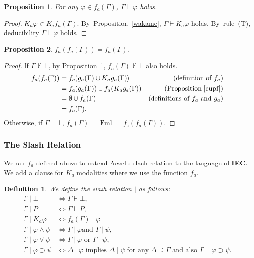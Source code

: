 \documentclass[doctor]{iscs-thesis}
\newcommand{\iec}{{\rm {\textbf{IEC}}}}
\newcommand{\fml}{\operatorname{Fml}}
\newtheorem{proposition}{Proposition}
\newtheorem{definition}{Definition}
\begin{document}
\begin{proposition}
 \label{kombu}
 For any $\varphi\in f_a(\Gamma)$, $\Gamma\vdash\varphi$ holds.
\end{proposition}
\begin{proof}
 $K_a\varphi\in K_af_a(\Gamma)$. By~Proposition~\ref{wakame},
 $\Gamma\vdash K_a\varphi$ holds.
 By~rule~(T), deducibility $\Gamma\vdash\varphi$ holds.
\end{proof}

\begin{proposition}
 \label{f_double}
 $f_a(f_a(\Gamma)) = f_a(\Gamma)$.
\end{proposition}
\begin{proof}
 If $\Gamma\not\vdash\bot$, by Proposition~\ref{kombu}, $f_a(\Gamma)\not\vdash\bot$ also holds.
 \begin{align*}
  f_a(f_a(\Gamma))
  &= f_a(g_a(\Gamma)\cup K_ag_a(\Gamma))
  &\text{(definition of $f_a$)}
\\
  &= f_a(g_a(\Gamma))\cup f_a(K_ag_a(\Gamma))
  &\text{(Proposition~\ref{cupf})}
\\
  &= \emptyset \cup f_a(\Gamma)
  &\text{(definitions of $f_a$ and $g_a$)}
\\
  &= f_a(\Gamma).
 \end{align*}
 Otherwise, if $\Gamma\vdash\bot$,
 $f_a(\Gamma) = \fml = f_a(f_a(\Gamma))$.
\end{proof}

\subsubsection{The Slash Relation}

\newcommand{\aslash}[0]{\mathbin{\mid}}
We use $f_a$ defined above to extend Aczel's slash relation to the language of \iec.
We add a clause for $K_a$ modalities where we use the function $f_a$.
\begin{definition}
 We define the slash relation $\aslash$ as follows:
 \begin{align*}
  \Gamma\aslash\bot& \Longleftrightarrow \Gamma\vdash\bot, \\
  \Gamma\aslash{}P& \Longleftrightarrow \Gamma\vdash P, \\
  \Gamma\aslash K_a\varphi &\Longleftrightarrow f_a(\Gamma)\aslash\varphi
  \\
  \Gamma\aslash \varphi \wedge \psi & \Longleftrightarrow \Gamma\aslash\varphi\text{
  and }\Gamma\aslash\psi,\\
  \Gamma\aslash \varphi\vee\psi &\Longleftrightarrow \Gamma\aslash\varphi\text{ or
  }\Gamma\aslash\psi,\\
  \Gamma\aslash \varphi\supset\psi &\Longleftrightarrow \Delta\aslash\varphi
  \text{ implies
  }\Delta\aslash\psi \text{ for any } \Delta\supseteq\Gamma
  \text{ and also }\Gamma\vdash{}\varphi\supset\psi.
 \end{align*}
\end{definition}
\end{document}
